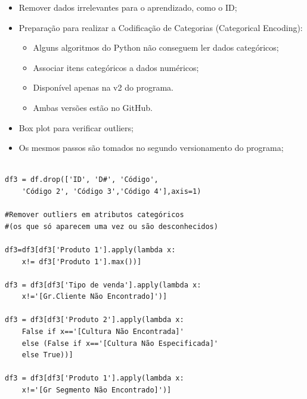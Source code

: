 \documentclass[compress]{beamer}
\begin{document}
\begin{frame}{}
    \begin{itemize}
        \item Remover dados irrelevantes para o aprendizado, como o ID;
        \item Preparação para realizar a Codificação de Categorias (Categorical Encoding):
        \begin{itemize}
            \item Alguns algoritmos do Python não conseguem ler dados categóricos;
            \item Associar itens categóricos a dados numéricos;
            \item Disponível apenas na v2 do programa.
            \item Ambas versões estão no GitHub.
        \end{itemize}
        \item Box plot para verificar outliers;
        \item Os mesmos passos são tomados no segundo versionamento do programa;
    \end{itemize}
\end{frame}

\begin{verbatim}

df3 = df.drop(['ID', 'D#', 'Código',
    'Código 2', 'Código 3','Código 4'],axis=1)

#Remover outliers em atributos categóricos
#(os que só aparecem uma vez ou são desconhecidos)

df3=df3[df3['Produto 1'].apply(lambda x:
    x!= df3['Produto 1'].max())]
    
df3 = df3[df3['Tipo de venda'].apply(lambda x:
    x!='[Gr.Cliente Não Encontrado]')]

df3 = df3[df3['Produto 2'].apply(lambda x:
    False if x=='[Cultura Não Encontrada]'
    else (False if x=='[Cultura Não Especificada]'
    else True))]

df3 = df3[df3['Produto 1'].apply(lambda x:
    x!='[Gr Segmento Não Encontrado]')]

\end{verbatim}
\end{document}
